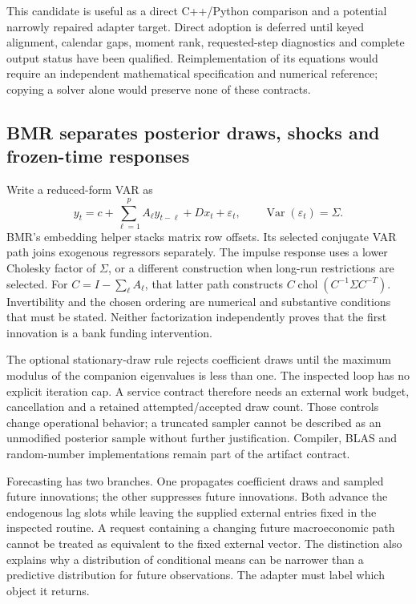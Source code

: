 This candidate is useful as a direct C++/Python comparison and a potential narrowly repaired adapter target. Direct adoption is deferred until keyed alignment, calendar gaps, moment rank, requested-step diagnostics and complete output status have been qualified. Reimplementation of its equations would require an independent mathematical specification and numerical reference; copying a solver alone would preserve none of these contracts.

\subsection{BMR separates posterior draws, shocks and frozen-time responses}

Write a reduced-form VAR as
\[
 y_t=c+\sum_{\ell=1}^{p}A_\ell y_{t-\ell}+D x_t+\varepsilon_t,
 \qquad \operatorname{Var}(\varepsilon_t)=\Sigma.
\]
BMR's embedding helper stacks matrix row offsets. Its selected conjugate VAR path joins exogenous regressors separately. The impulse response uses a lower Cholesky factor of $\Sigma$, or a different construction when long-run restrictions are selected. For $C=I-\sum_\ell A_\ell$, that latter path constructs $C\operatorname{chol}(C^{-1}\Sigma C^{-T})$. Invertibility and the chosen ordering are numerical and substantive conditions that must be stated. Neither factorization independently proves that the first innovation is a bank funding intervention.\citep{exec25_cdyn_bmr}

The optional stationary-draw rule rejects coefficient draws until the maximum modulus of the companion eigenvalues is less than one. The inspected loop has no explicit iteration cap. A service contract therefore needs an external work budget, cancellation and a retained attempted/accepted draw count. Those controls change operational behavior; a truncated sampler cannot be described as an unmodified posterior sample without further justification. Compiler, BLAS and random-number implementations remain part of the artifact contract.

Forecasting has two branches. One propagates coefficient draws and sampled future innovations; the other suppresses future innovations. Both advance the endogenous lag slots while leaving the supplied external entries fixed in the inspected routine. A request containing a changing future macroeconomic path cannot be treated as equivalent to the fixed external vector. The distinction also explains why a distribution of conditional means can be narrower than a predictive distribution for future observations. The adapter must label which object it returns.\citep{exec25_cdyn_bmr}

